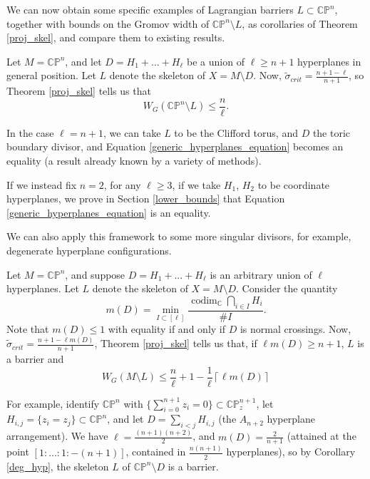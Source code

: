 \documentclass{article}
\numberwithin{equation}{section}
\numberwithin{figure}{section}
\begin{document}
We can now obtain some specific examples of Lagrangian barriers $L\subset\mathbb{CP}^n$, together with bounds on the Gromov width of $\mathbb{CP}^n\setminus L$, as corollaries of Theorem \ref{proj_skel}, and compare them to existing results.

\begin{cor}
\label{generic_hyperplanes}
Let $M=\mathbb{CP}^n$, and let $D=H_1+...+H_\ell$ be a union of $\ell\geq n+1$ hyperplanes in general position. Let $L$ denote the skeleton of $X=M\setminus D$. Now, $\tilde{\sigma}_{crit}=\frac{n+1-\ell}{n+1}$, so Theorem \ref{proj_skel} tells us that 
\begin{equation}
    W_G(\mathbb{CP}^n\setminus L)\leq \frac{n}{\ell}.
    \label{generic_hyperplanes_equation}
\end{equation}
\end{cor}
In the case $\ell=n+1$, we can take $L$ to be the Clifford torus, and $D$ the toric boundary divisor, and Equation \eqref{generic_hyperplanes_equation} becomes an equality (a result already known by a variety of methods).

If we instead fix $n=2$, for any $\ell\geq 3$, if we take $H_1$, $H_2$ to be coordinate hyperplanes, we prove in Section \ref{lower_bounds} that Equation \eqref{generic_hyperplanes_equation} is an equality.

We can also apply this framework to some more singular divisors, for example, degenerate hyperplane configurations.
\begin{cor}
\label{deg_hyp}
Let $M=\mathbb{CP}^n$, and suppose $D=H_1+ ...+ H_\ell$ is an arbitrary union of $\ell$ hyperplanes. Let $L$ denote the skeleton of $X=M\setminus D$. Consider the quantity
\begin{equation}
m(D)=\min_{I\subset [\ell]}\frac{\operatorname{codim}_\mathbb{C}\bigcap_{i\in I}H_i}{\#I}.
\end{equation}
Note that $m(D)\leq 1$ with equality if and only if $D$ is normal crossings. Now, $\tilde{\sigma}_{crit}=\frac{n+1-\ell m(D)}{n+1}$, Theorem \ref{proj_skel} tells us that, if $\ell m(D)\geq n+1$, $L$ is a barrier and
\begin{equation}
    W_G(M\setminus L)\leq \frac{n}{\ell}+1-\frac{1}{\ell}\left\lceil \ell m(D) \right\rceil
\end{equation}
\end{cor}

For example, identify $\mathbb{CP}^n$ with $\{\sum_{i=0}^{n+1}z_i=0\}\subset \mathbb{CP}^{n+1}_z$, let $H_{i,j}=\{z_i=z_j\}\subset\mathbb{CP}^n$, and let $D=\sum_{i<j}H_{i,j}$ (the $A_{n+2}$ hyperplane arrangement). We have $\ell=\frac{(n+1)(n+2)}{2}$, and $m(D)=\frac{2}{n+1}$ (attained at the point $[1:...:1:-(n+1)]$, contained in $\frac{n(n+1)}{2}$ hyperplanes), so by Corollary \ref{deg_hyp}, the skeleton $L$ of $\mathbb{CP}^n\setminus D$ is a barrier.
\end{document}
